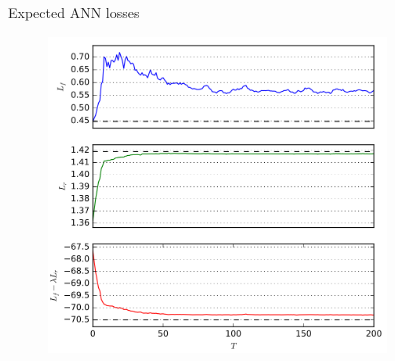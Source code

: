 \begin{frame}{Expected ANN losses}
    \begin{figure}
        \centering
        \includegraphics[width=0.8\textwidth]{figures_theory/losses_paper.png}
        \caption{\cite{Louppe:2016ylz}}
    \end{figure}
\end{frame}